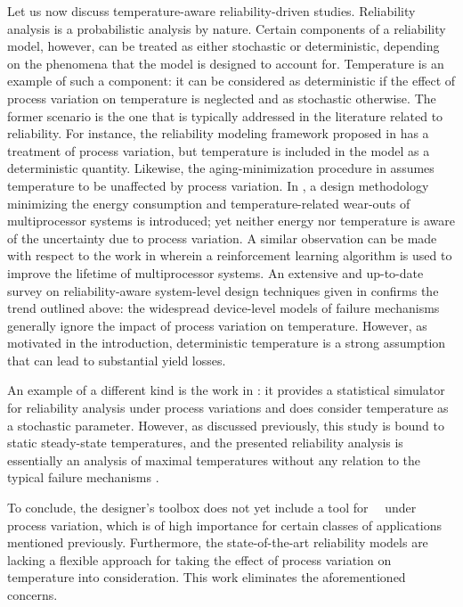 Let us now discuss temperature-aware reliability-driven studies.
Reliability analysis is a probabilistic analysis by nature.
Certain components of a reliability model, however, can be treated as either stochastic or deterministic, depending on the phenomena that the model is designed to account for.
Temperature is an example of such a component: it can be considered as deterministic if the effect of process variation on temperature is neglected and as stochastic otherwise.
The former scenario is the one that is typically addressed in the literature related to reliability.
For instance, the reliability modeling framework proposed in \cite{xiang2010} has a treatment of process variation, but temperature is included in the model as a deterministic quantity.
Likewise, the aging-minimization procedure in \cite{ukhov2012} assumes temperature to be unaffected by process variation.
In \cite{das2014a}, a design methodology minimizing the energy consumption and temperature-related wear-outs of multiprocessor systems is introduced; yet neither energy nor temperature is aware of the uncertainty due to process variation.
A similar observation can be made with respect to the work in \cite{das2014c} wherein a reinforcement learning algorithm is used to improve the lifetime of multiprocessor systems.
An extensive and up-to-date survey on reliability-aware system-level design techniques given in \cite{das2014b} confirms the trend outlined above: the widespread device-level models of failure mechanisms generally ignore the impact of process variation on temperature.
However, as motivated in the introduction, deterministic temperature is a strong assumption that can lead to substantial yield losses.

An example of a different kind is the work in \cite{lee2013}: it provides a statistical simulator for reliability analysis under process variations and does consider temperature as a stochastic parameter.
However, as discussed previously, this study is bound to static steady-state temperatures, and the presented reliability analysis is essentially an analysis of maximal temperatures without any relation to the typical failure mechanisms \cite{jedec}.

To conclude, the designer's toolbox does not yet include a tool for \DSS\ \ta\ under process variation, which is of high importance for certain classes of applications mentioned previously.
Furthermore, the state-of-the-art reliability models are lacking a flexible approach for taking the effect of process variation on temperature into consideration.
This work eliminates the aforementioned concerns.
